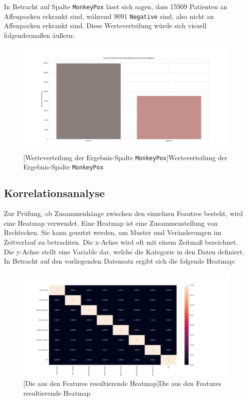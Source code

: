 \documentclass[13pt,a4paper, listof=entryprefix, bibliography=totocnumbered,toc=listofnumbered,lof=listofnumbered]{scrartcl}
\begin{document}
	In Betracht auf Spalte \lstinline{MonkeyPox} lässt sich sagen, dass 15909 Patienten an Affenpocken erkrankt sind, während 9091 \lstinline{Negative} sind,
	also nicht an Affenpocken erkrankt sind. Diese Werteverteilung würde sich visuell folgendermaßen äußern:

	\begin{figure}[H]
		\centering
		\includegraphics[width=0.8\linewidth]{Bilder/monkey_pox_plot.png}
		[Werteverteilung der Ergebnis-Spalte \lstinline{MonkeyPox}]{Werteverteilung der Ergebnis-Spalte \lstinline{MonkeyPox}}
		\label{fig:monkey_pox_plot}
	\end{figure}

	\subsection{Korrelationsanalyse}
		\label{ch:korrleations_analyse}

	Zur Prüfung, ob Zusammenhänge zwischen den einzelnen Feautres besteht, wird eine Heatmap verwendet. 
	Eine Heatmap ist eine Zusammenstellung von Rechtecken. Sie kann genutzt werden, um Muster und Veränderungen im
	Zeitverlauf zu betrachten. Die x-Achse wird oft mit einem Zeitmaß bezeichnet. Die y-Achse stellt eine Variable dar, 
	welche die Kategorie in den Daten definiert. In Betracht auf den vorliegenden Datensatz ergibt sich die folgende Heatmap:

	\begin{figure}[H]
		\centering
		\includegraphics[width=0.8\linewidth]{Bilder/heat_map.png}
		[Die aus den Features resultierende Heatmap]{Die aus den Features resultierende Heatmap}
		\label{fig:heatmap}
	\end{figure}
	
\end{document}
